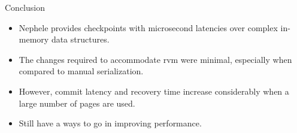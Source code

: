 \begin{block}{Conclusion}
    \begin{itemize}
        \item Nephele provides checkpoints with microsecond latencies over
            complex in-memory data structures.
        \item The changes required to accommodate rvm were minimal,
            especially when compared to manual serialization.
        \item However, commit latency and recovery time increase considerably
            when a large number of pages are used.
        \item Still have a ways to go in improving performance.
    \end{itemize}
\end{block}

